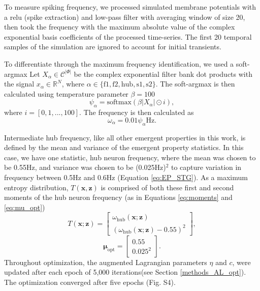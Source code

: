 \documentclass[11pt]{article}
\begin{document}
To measure spiking frequency, we processed simulated membrane potentials with a relu (spike extraction) and low-pass filter with averaging window of size 20, then took the frequency with the maximum absolute value of the complex exponential basis coefficients of the processed time-series.  The first 20 temporal samples of the simulation are ignored to account for initial transients.

To differentiate through the maximum frequency identification, we used a soft-argmax
Let $X_\alpha \in \mathcal{C}^{|\Phi|}$ be the complex exponential filter bank dot products with the signal $x_\alpha \in \mathbb{R}^{N}$, where $\alpha \in \{ \text{f1}, \text{f2}, \text{hub}, \text{s1}, \text{s2} \}$.  
The soft-argmax is then calculated using temperature parameter $\beta=100$
\begin{equation}
\psi_\alpha = \text{softmax}(\beta|X_\alpha|\odot i),
\end{equation}
where $i = [0, 1, ..., 100]$.
The frequency is then calculated as 
\begin{equation}
\omega_\alpha = 0.01\psi_\alpha \text{Hz}.
\end{equation}

Intermediate hub frequency, like all other emergent properties in this work, is defined by the mean and variance of the emergent property statistics.
In this case, we have one statistic, hub neuron frequency, where the mean was chosen to be 0.55Hz, and variance was chosen to be (0.025Hz)$^2$ to capture variation in frequency between 0.5Hz and 0.6Hz (Equation \ref{eq:EP_STG}).
As a maximum entropy distribution, $T(\mathbf{x}, \mathbf{z})$ is comprised of both these first and second moments of the hub neuron frequency (as in Equations \ref{eq:moments} and \ref{eq:mu_opt})
\begin{equation} 
T(\mathbf{x}; \mathbf{z}) = \begin{bmatrix} \omega_{\text{hub}}(\mathbf{x}; \mathbf{z}) \\ \left( \omega_{\text{hub}}(\mathbf{x}; \mathbf{z}) - 0.55 \right)^2 \end{bmatrix},
\end{equation}
\begin{equation} 
\bm{\mu}_{\text{opt}} = \begin{bmatrix} 0.55 \\ 0.025^2 \end{bmatrix}.
\end{equation}
Throughout optimization, the augmented Lagrangian parameters $\eta$ and $c$, were updated after each epoch of 5,000 iterations(see Section \ref{methods_AL_opt}).  
The optimization converged after five epochs (Fig. S4).
\end{document}
